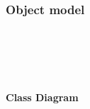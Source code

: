 \subsubsection{Object model}
		\\[1in]
	\begin{center}	
		\\[.2in]
		\\
	\end{center}	
	\textbf{Class Diagram} \\
	\pagebreak

